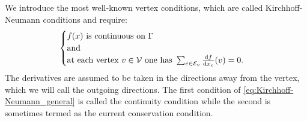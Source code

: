 We introduce the most well-known vertex conditions, which are called Kirchhoff-Neumann conditions and require: 
\begin{equation}
    \label{eq:Kirchhoff-Neumann_general}
    \begin{cases} 
        f(x) \text{ is continuous on } \Gamma \\ \text{and} \\  \text{at each vertex } v \in \mathcal{V} \text{ one has } \sum_{e \in \mathcal{E}_v} \frac{\textup{d} f}{\textup{d} x_e}(v) = 0.
    \end{cases}
\end{equation}
The derivatives are assumed to be taken in the directions away from the vertex, which we will call the outgoing directions. The first condition of \cref{eq:Kirchhoff-Neumann_general} is called the continuity condition while the second is sometimes termed as the current conservation condition.

